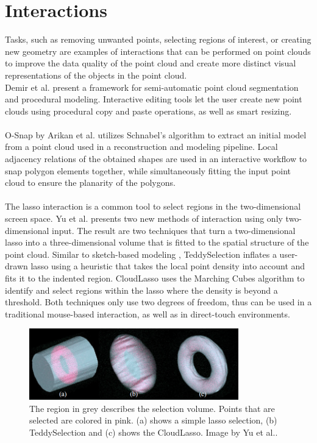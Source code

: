 \section {Interactions}
\label{sec:related_work_interactions}
Tasks, such as removing unwanted points, selecting regions of interest, or creating new geometry are examples of interactions that can be performed on point clouds to improve the data quality of the point cloud and create more distinct visual representations of the objects in the point cloud.  
\\
Demir et al. \cite{demir2015procedural} present a framework for semi-automatic point cloud segmentation and procedural modeling. Interactive editing tools let the user create new point clouds using procedural copy and paste operations, as well as smart resizing. 
\\
\\
O-Snap by Arikan et al. \cite{arikan-2013-osn} utilizes Schnabel's algorithm to extract an initial model from a point cloud used in a reconstruction and modeling pipeline. Local adjacency relations of the obtained shapes are used in an interactive workflow to snap polygon elements together, while simultaneously fitting the input point cloud to ensure the planarity of the polygons. 
\\
\\
The lasso interaction is a common tool to select regions in the two-dimensional screen space. Yu et al. \cite{yu2012efficient} presents two new methods of interaction using only two-dimensional input. The result are two techniques that turn a two-dimensional lasso into a three-dimensional volume that is fitted to the spatial structure of the point cloud. Similar to sketch-based modeling \cite{igarashi2007teddy}, TeddySelection inflates a user-drawn lasso using a heuristic that takes the local point density into account and fits it to the indented region. CloudLasso uses the Marching Cubes algorithm \cite{lorensen1987marching} to identify and select regions within the lasso where the density is beyond a threshold. Both techniques only use two degrees of freedom, thus can be used in a traditional mouse-based interaction, as well as in direct-touch environments. 

\begin{figure}[ht]
    \centering
    \includegraphics[width=0.81\textwidth]{Related_Work/teddyCloudSelection.png}%
    \caption[Comparison of (a) simple lasso selection, (b) TeddySelection and (c) CloudLasso]
		{The region in grey describes the selection volume. Points that are selected are colored in pink. (a) shows a simple lasso selection, (b) TeddySelection and (c) shows the CloudLasso. Image by Yu et al.\cite{yu2012efficient}.}
    \label{fig:teddyCloudSelection}
\end{figure}


